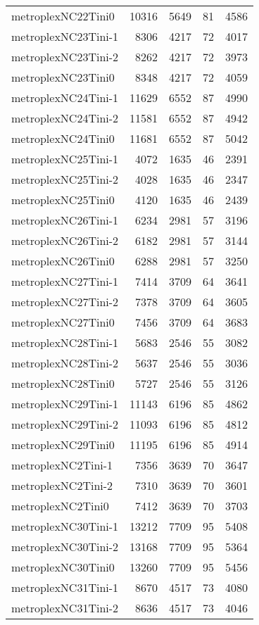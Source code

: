 \begin{longtable}{lrrrr}
metroplexNC22Tini0 & 10316 & 5649 & 81 & 4586 \\
metroplexNC23Tini-1 & 8306 & 4217 & 72 & 4017 \\
metroplexNC23Tini-2 & 8262 & 4217 & 72 & 3973 \\
metroplexNC23Tini0 & 8348 & 4217 & 72 & 4059 \\
metroplexNC24Tini-1 & 11629 & 6552 & 87 & 4990 \\
metroplexNC24Tini-2 & 11581 & 6552 & 87 & 4942 \\
metroplexNC24Tini0 & 11681 & 6552 & 87 & 5042 \\
metroplexNC25Tini-1 & 4072 & 1635 & 46 & 2391 \\
metroplexNC25Tini-2 & 4028 & 1635 & 46 & 2347 \\
metroplexNC25Tini0 & 4120 & 1635 & 46 & 2439 \\
metroplexNC26Tini-1 & 6234 & 2981 & 57 & 3196 \\
metroplexNC26Tini-2 & 6182 & 2981 & 57 & 3144 \\
metroplexNC26Tini0 & 6288 & 2981 & 57 & 3250 \\
metroplexNC27Tini-1 & 7414 & 3709 & 64 & 3641 \\
metroplexNC27Tini-2 & 7378 & 3709 & 64 & 3605 \\
metroplexNC27Tini0 & 7456 & 3709 & 64 & 3683 \\
metroplexNC28Tini-1 & 5683 & 2546 & 55 & 3082 \\
metroplexNC28Tini-2 & 5637 & 2546 & 55 & 3036 \\
metroplexNC28Tini0 & 5727 & 2546 & 55 & 3126 \\
metroplexNC29Tini-1 & 11143 & 6196 & 85 & 4862 \\
metroplexNC29Tini-2 & 11093 & 6196 & 85 & 4812 \\
metroplexNC29Tini0 & 11195 & 6196 & 85 & 4914 \\
metroplexNC2Tini-1 & 7356 & 3639 & 70 & 3647 \\
metroplexNC2Tini-2 & 7310 & 3639 & 70 & 3601 \\
metroplexNC2Tini0 & 7412 & 3639 & 70 & 3703 \\
metroplexNC30Tini-1 & 13212 & 7709 & 95 & 5408 \\
metroplexNC30Tini-2 & 13168 & 7709 & 95 & 5364 \\
metroplexNC30Tini0 & 13260 & 7709 & 95 & 5456 \\
metroplexNC31Tini-1 & 8670 & 4517 & 73 & 4080 \\
metroplexNC31Tini-2 & 8636 & 4517 & 73 & 4046 \\

\end{longtable}
